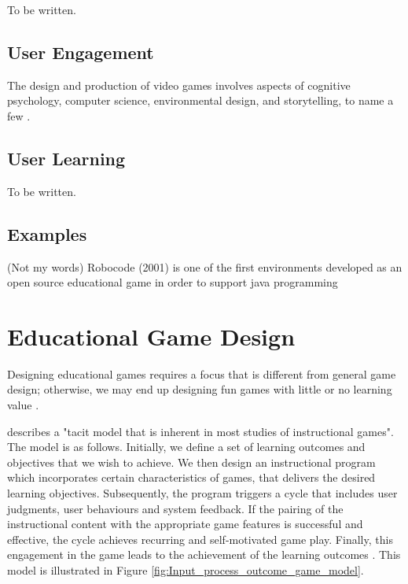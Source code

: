 \documentclass[a4paper,11.5pt]{report}
\numberwithin{figure}{section}
\numberwithin{table}{section}
\numberwithin{equation}{section}
\numberwithin{equation}{section}
\begin{document}
To be written.

\subsection{User Engagement}

The design and production of video games involves aspects of cognitive psychology, computer science, environmental design, and storytelling, to name a few \cite{Koster2004}.

\subsection{User Learning}

To be written.

\subsection{Examples}

(Not my words) Robocode (2001) is one of the first environments developed as an open source educational game in order to support java programming

\section{Educational Game Design}

Designing educational games requires a focus that is different from general game design; otherwise, we may end up designing fun games with little or no learning value \cite{Barnes2007}.

\citeauthor{Driskell2002} describes a "tacit model that is inherent in most studies of instructional games". The model is as follows. Initially, we define a set of learning outcomes and objectives that we wish to achieve. We then design an instructional program which incorporates certain characteristics of games, that delivers the desired learning objectives. Subsequently, the program triggers a cycle that includes user judgments, user behaviours and system feedback. If the pairing of the instructional content with the appropriate game features is successful and effective, the cycle achieves recurring and self-motivated game play. Finally, this engagement in the game leads to the achievement of the learning outcomes \cite{Driskell2002}. This model is illustrated in Figure \ref{fig:Input_process_outcome_game_model}.
\end{document}
